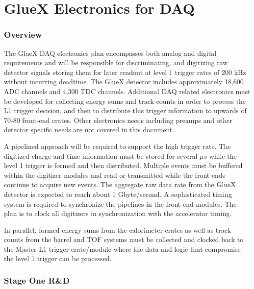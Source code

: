 \documentclass[10pt]{article}
\begin{document}
\section*{GlueX Electronics for DAQ}


\subsubsection*{Overview}

The GlueX DAQ electronics plan encompasses both analog and digital requirements and will be 
responsible for discriminating, and digitizing raw detector signals
storing them for later readout at level 1 trigger rates of 200 kHz
without incurring deadtime.  The GlueX detector includes approximately 18,600 ADC 
channels and 4,300 TDC channels. Additional DAQ related electronics must be developed for
collecting energy sums and track counts in order to process the L1 trigger decision, and
then to distribute this trigger information to upwards of 70-80 front-end crates. Other
electronics needs including preamps and other detector specific needs are not covered
in this document.

A pipelined approach will be required to support the high trigger rate.  The
digitized charge and time information must be stored for several $ \mu s $ while the
level 1 trigger is formed and then distributed.  Multiple events must be buffered within
the digitizer modules and read or transmitted while the front ends continue to
acquire new events.  The aggregate raw data rate from the GlueX detector is expected to
reach  about 1 Gbyte/second. A sophisticated timing system is required to synchronize the
pipelines in the front-end modules.  The plan is to clock all digitizers in synchronization
with the accelerator timing.

In parallel, formed energy sums from the calorimeter crates as well as track counts from the 
barrel and TOF systems must be collected and clocked back to the Master L1 trigger crate/module 
where the data and logic that compromise the level 1 trigger can be processed.


\subsubsection*{Stage One R\&D}
\end{document}
